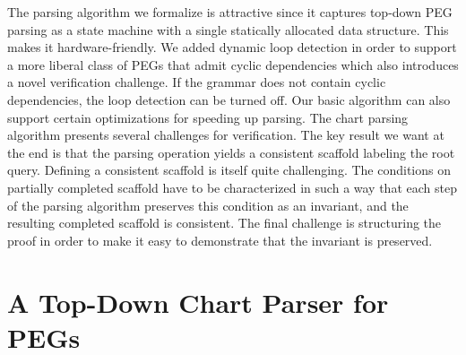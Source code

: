 \documentclass[sigplan,10pt,anonymous,review]{acmart}\settopmatter{printfolios=true,printccs=false,printacmref=false}
\begin{document}
\begin{CCSXML}
The parsing algorithm we formalize is attractive since it captures
top-down PEG parsing as a state machine with a single statically
allocated data structure.  This makes it hardware-friendly.  We added
dynamic loop detection in order to support a more liberal class of 
PEGs that admit cyclic dependencies which also introduces a novel verification
challenge.  If the grammar does not contain cyclic dependencies, the
loop detection can be turned off.  Our basic
algorithm can also support certain optimizations for speeding up parsing.
The chart parsing algorithm presents several challenges for verification.
The key result we want at the end is that the parsing operation
yields a consistent scaffold labeling the root query.  Defining a consistent
scaffold is itself quite challenging.  The conditions on partially
completed scaffold have to be characterized in such a way that each step
of the parsing algorithm preserves this condition as an invariant, and
the resulting completed scaffold is consistent.  The final challenge is
structuring the proof in order to make it easy to demonstrate that the
invariant is preserved.  





\section{A Top-Down Chart Parser for PEGs}


\end{CCSXML}
\end{document}
